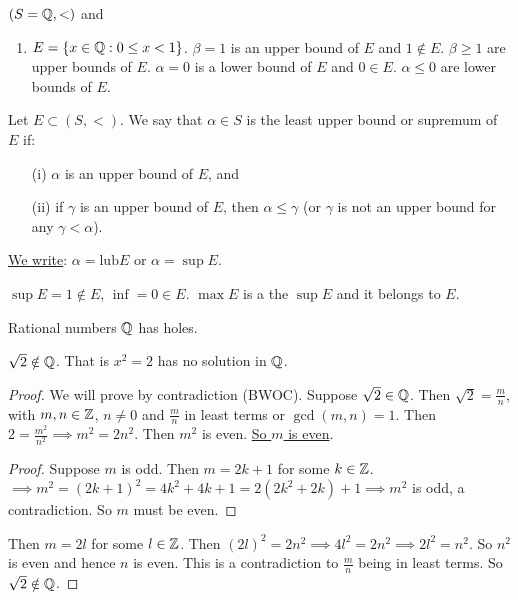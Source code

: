 \documentclass[]{article}
\begin{document}
\begin{example}
	$(S = \mathbb{Q},<)$ and
	\begin{enumerate}
		\item $E = \{x \in \mathbb{Q}: 0\leq x < 1\}$. $\beta = 1$ is an upper bound of $E$ and $1\notin E$. $\beta \geq 1$ are upper bounds of $E$. $\alpha = 0$ is a lower bound of $E$ and $0\in E$. $\alpha \leq 0$ are lower bounds of $E$.
	\end{enumerate}
\end{example}
\begin{definition}
	 Let $E\subset (S,<)$. We say that $\alpha \in S$ is the least upper bound or supremum of $E$ if:
	\begin{itemize}
		\item[(i)] $\alpha$ is an upper bound of $E$, and
		\item[(ii)] if $\gamma$ is an upper bound of $E$, then $\alpha \leq \gamma$ (or $\gamma $ is not an upper bound for any $\gamma < \alpha$).
	\end{itemize}
\end{definition}
\ul{We write}: $\alpha = \text{lub} E$ or $\alpha = \sup E$.
\begin{example}
	[continued] $\sup E = 1 \notin E$, $\inf = 0 \in E$. $\max E$ is a the $\sup E$ and it belongs to $E$.
\end{example}

Rational numbers $\mathbb{Q}$ has holes.
\begin{lemma}
	$\sqrt{2} \notin \mathbb{Q}$. That is $x^2 = 2$ has no solution in $\mathbb{Q}$.
\end{lemma}
\begin{proof}
	We will prove by contradiction (BWOC). Suppose $\sqrt{2} \in \mathbb{Q}$. Then $\sqrt{2} = \frac{m}{n}$, with $m,n\in \mathbb{Z}$, $n\neq 0$ and $\frac{m}{n}$ in least terms or $\gcd (m,n) = 1$. Then $2 = \frac{m^2}{n^2} \implies m^2 = 2n^2$. Then $m^2$ is even. \ul{So $m$ is even}.
	\begin{proof}
		Suppose $m$ is odd. Then $m = 2k + 1$ for some $k \in \mathbb{Z}$. $\implies m^2 = (2k+1)^2 = 4k^2 + 4k + 1 = 2(2k^2 + 2k) + 1 \implies m^2$ is odd, a contradiction. So $m$ must be even.
	\end{proof}
	Then $m = 2l$ for some $l\in \mathbb{Z}$. Then $(2l)^2 = 2n^2 \implies 4l^2 = 2n^2 \implies 2l^2 = n^2$. So $n^2$ is even and hence $n$ is even. This is a contradiction to $\frac{m}{n}$ being in least terms. So $\sqrt{2} \notin \mathbb{Q}$.
\end{proof}
\end{document}
